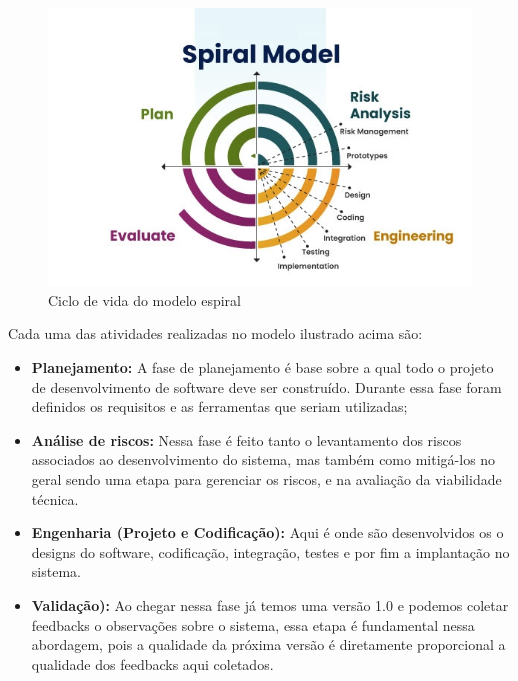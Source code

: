 \newpage
\begin{figure}
    \centering
    \includegraphics[width=0.9\linewidth]{figuras/spiral_model.jpg}
    \caption{Ciclo de vida do modelo espiral}
    \label{fig:enter-label}
\end{figure}
Cada uma das atividades realizadas no modelo ilustrado acima são:
\begin{itemize}
    \item \textbf{Planejamento:} A fase de planejamento é base sobre a qual todo o projeto de desenvolvimento de software deve ser construído. Durante essa fase foram definidos os requisitos e as ferramentas que seriam utilizadas;
    \item \textbf{Análise de riscos:} Nessa fase é feito tanto o levantamento dos riscos associados ao desenvolvimento do sistema, mas também como mitigá-los no geral sendo uma etapa para gerenciar os riscos, e na avaliação da viabilidade técnica. 
    \item \textbf{Engenharia (Projeto e Codificação):} Aqui é onde são desenvolvidos os o designs do software, codificação, integração, testes e por fim a implantação no sistema.
    \item \textbf{Validação):} Ao chegar nessa fase já temos uma versão 1.0 e podemos coletar feedbacks o observações sobre o sistema, essa etapa é fundamental nessa abordagem, pois a qualidade da próxima versão é diretamente proporcional a qualidade dos feedbacks aqui coletados.
\end{itemize}
